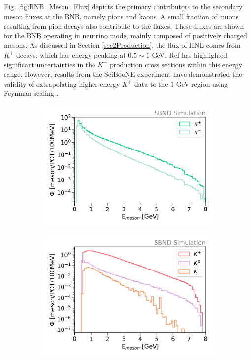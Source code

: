 Fig. \ref{fig:BNB_Meson_Flux} depicts the primary contributors to the secondary meson fluxes at the BNB, namely pions and kaons.
A small fraction of muons resulting from pion decays also contribute to the fluxes.
These fluxes are shown for the BNB operating in neutrino mode, mainly composed of positively charged mesons.
As discussed in Section \ref{sec2Production}, the flux of HNL comes from $K^{+}$ decays, which has energy peaking at $0.5 \sim 1$ GeV.
Ref \cite{BNBMiniBooNE} has highlighted significant uncertainties in the $K^{+}$ production cross sections within this energy range.
However, results from the SciBooNE experiment have demonstrated the validity of extrapolating higher energy $K^{+}$ data to the 1 GeV region using Feynman scaling \cite{SciBooNE}. 

\begin{figure}[hb!]
\begin{subfigure}{.5\linewidth}
\centering
\includegraphics[width=1.0\textwidth]{BNB_Meson_Pion_Flux}
\end{subfigure}%
\begin{subfigure}{.5\linewidth}
\centering
\includegraphics[width=1.0\textwidth]{BNB_Meson_Kaon_Flux}

\end{subfigure}
\end{figure}
